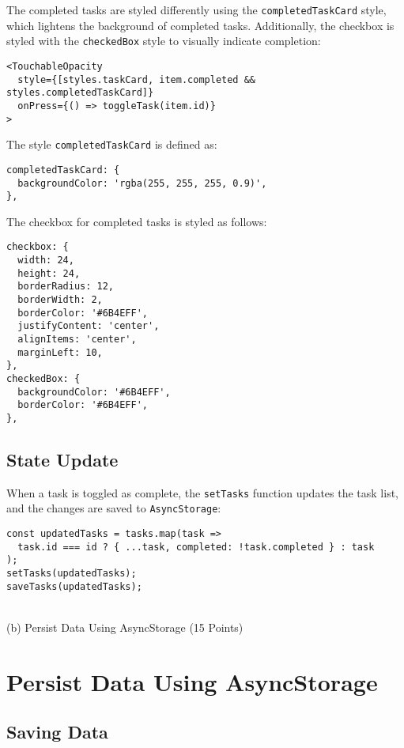 \documentclass{article}
\begin{document}
The completed tasks are styled differently using the \texttt{completedTaskCard} style, which lightens the background of completed tasks. Additionally, the checkbox is styled with the \texttt{checkedBox} style to visually indicate completion:

\begin{verbatim}
<TouchableOpacity
  style={[styles.taskCard, item.completed && styles.completedTaskCard]}
  onPress={() => toggleTask(item.id)}
>
\end{verbatim}

The style \texttt{completedTaskCard} is defined as:

\begin{verbatim}
completedTaskCard: {
  backgroundColor: 'rgba(255, 255, 255, 0.9)',
},
\end{verbatim}

The checkbox for completed tasks is styled as follows:

\begin{verbatim}
checkbox: {
  width: 24,
  height: 24,
  borderRadius: 12,
  borderWidth: 2,
  borderColor: '#6B4EFF',
  justifyContent: 'center',
  alignItems: 'center',
  marginLeft: 10,
},
checkedBox: {
  backgroundColor: '#6B4EFF',
  borderColor: '#6B4EFF',
},
\end{verbatim}

\subsection*{State Update}

When a task is toggled as complete, the \texttt{setTasks} function updates the task list, and the changes are saved to \texttt{AsyncStorage}:

\begin{verbatim}
const updatedTasks = tasks.map(task =>
  task.id === id ? { ...task, completed: !task.completed } : task
);
setTasks(updatedTasks);
saveTasks(updatedTasks);
\end{verbatim}\\

\vspace{2cm}
(b) Persist Data Using AsyncStorage (15 Points)

\section*{Persist Data Using AsyncStorage}

\subsection*{Saving Data}
\end{document}

